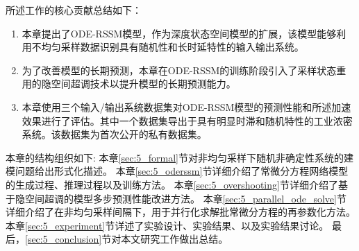 
所述工作的核心贡献总结如下：
\begin{enumerate}
\item 本章提出了ODE-RSSM模型，作为深度状态空间模型的扩展，该模型能够利用不均匀采样数据识别具有随机性和长时延特性的输入输出系统。
\item 为了改善模型的长期预测，本章在ODE-RSSM的训练阶段引入了采样状态重用的隐空间超调技术以提升模型的长期预测能力。
\item 本章使用三个输入/输出系统数据集对ODE-RSSM模型的预测性能和所述加速效果进行了评估。其中一个数据集导出于具有明显时滞和随机特性的工业浓密系统。该数据集为首次公开的私有数据集。
\end{enumerate}

本章的结构组织如下:
本章\ref{sec:5_formal}节对非均匀采样下随机非确定性系统的建模问题给出形式化描述。
本章\ref{sec:5_oderssm}节详细介绍了常微分方程网络模型的生成过程、推理过程以及训练方法。
本章\ref{sec:5_overshooting}节详细介绍了基于隐空间超调的模型多步预测性能改进方法。
本章\ref{sec:5_parallel_ode_solve}节详细介绍了在非均匀采样间隔下，用于并行化求解批常微分方程的再参数化方法。
本章\ref{sec:5_experiment}节详述了实验设计、实验结果、以及实验结果讨论。
最后，\ref{sec:5_conclusion}节对本文研究工作做出总结。



